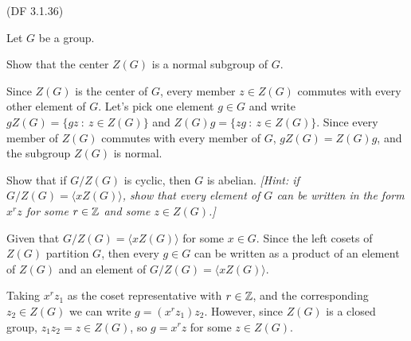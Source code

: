 \begin{problem}{(\textsf{DF 3.1.36})}

  \noindent
  Let $G$ be a group.
  \begin{enumalph}
    \item Show that the center $Z(G)$ is a normal subgroup of $G$.
    \begin{Answer}
      Since $Z(G)$ is the center of $G$, every member $z \in Z(G)$ commutes with
      every other element of $G$.
      Let's pick one element $g \in G$
      and write $gZ(G) = \{gz\ \colon\ z \in Z(G)\}$
      and $Z(G)g = \{ zg\ \colon\ z \in Z(G) \}$.
      Since every member of $Z(G)$ commutes with every member of $G$,
      $gZ(G) = Z(G)g$, and the subgroup $Z(G)$ is normal.
    \end{Answer}
    \item Show that if $G/Z(G)$ is cyclic, then $G$ is abelian.
      \emph{[Hint: if $G/Z(G)=\langle xZ(G) \rangle$,
      show that every element of $G$ can be written in 
      the form $x^r z$ for some $r \in \mathbb{Z}$ and some $z \in Z(G)$.]}
    \begin{Answer}
      Given that $G/Z(G) = \langle xZ(G) \rangle$ for some $x \in G$.
      Since the left cosets of $Z(G)$ partition $G$, 
      then every $g \in G$ can be written as a product of an element
      of $Z(G)$ and an element of $G/Z(G) = \langle xZ(G) \rangle$.
      
      Taking $x^rz_1$ as the coset representative with $r \in \mathbb{Z}$,
      and the corresponding $z_2 \in Z(G)$
      we can write $g = (x^r z_1) z_2$.
      However, since $Z(G)$ is a closed group, $z_1 z_2 = z \in Z(G)$,
      so $g = x^{r}z$ for some $z \in Z(G)$.
    \end{Answer}
  \end{enumalph}
\end{problem}
